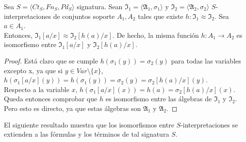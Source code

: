\begin{lema}\label{sustiso}
Sea $S = \langle Ct_{S}, Fn_{S}, Pd_{S}\rangle$ signatura. Sean $\mathfrak{I}_1 = \langle \mathfrak{A}_1, \sigma_1 \rangle$ y $\mathfrak{I}_2 = \langle \mathfrak{A}_2, \sigma_2 \rangle$ $S$-interpretaciones de conjuntos soporte $A_1,A_2$ tales que existe $h: \mathfrak{I}_1 \approx \mathfrak{I}_2$. Sea $a\in A_1$.\\
Entonces, $\mathfrak{I}_1[a/x]\approx\mathfrak{I}_2[h(a)/x]$. De hecho, la misma función $h:A_1\to A_2$ es isomorfismo entre $\mathfrak{I}_1[a/x]$ y $\mathfrak{I}_2[h(a)/x]$.
\end{lema}
\begin{proof}
Está claro que se cumple $h(\sigma_1(y)) = \sigma_2(y)$ para todas las variables excepto x, ya que si $y\in Var\setminus \{x\}$, $h(\sigma_1[a/x](y))=h(\sigma_1(y))=\sigma_2(y)=\sigma_2[h(a)/x](y)$.\\
Respecto a la variable $x$, $h(\sigma_1[a/x](x))=h(a)=\sigma_2[h(a)/x](x)$.\\
Queda entonces comprobar que $h$ es isomorfismo entre las álgebras de $\mathfrak{I}_1$ y $\mathfrak{I}_2$. Pero esto es directo, ya que estas álgebras son $\mathfrak{A}_1$ y $\mathfrak{A}_2$.
\end{proof}

El siguiente resultado muestra que los isomorfismos entre $S$-interpretaciones se extienden a las fórmulas y los términos de tal signatura $S$.

